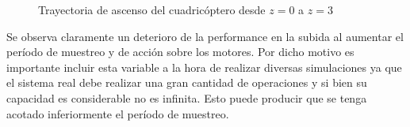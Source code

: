 \documentclass[main]{subfiles}
\begin{document}
\begin{figure} [h!]
  \centering
  \caption{Trayectoria de ascenso del cuadric\'optero desde $z=0$ a $z=3$}
  \label{fig:t_muestreo}
\end{figure} 
 
Se observa claramente un deterioro de la performance en la subida al aumentar el per\'iodo de muestreo y de acci\'on sobre los motores. Por dicho motivo es importante incluir esta variable a la hora de realizar diversas simulaciones ya que el sistema real debe realizar una gran cantidad de operaciones y si bien su capacidad es considerable no es infinita. Esto puede producir que se tenga acotado inferiormente el per\'iodo de muestreo.\\
\end{document}
